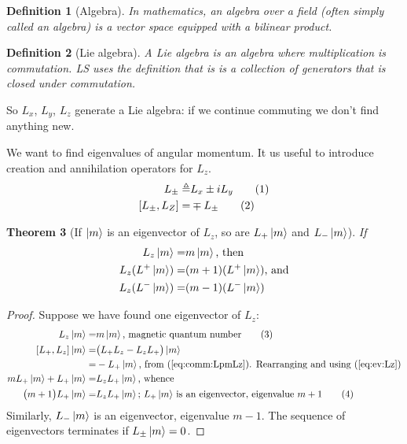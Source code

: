 \documentclass[]{article}
\newcommand\numberthis{\addtocounter{equation}{1}\tag{\theequation}}
\newtheorem{thm}{Theorem}
\newtheorem{defn}[thm]{Definition}
\begin{document}
\begin{defn}[Algebra]
	In mathematics, an \emph{algebra over a field } (often simply called an algebra) is a vector space equipped with a bilinear product. 
\end{defn}

\begin{defn}[Lie algebra]
	A Lie algebra is an algebra where multiplication is commutation. LS uses the definition that is is a collection of generators that is closed under commutation.
\end{defn}

So $L_x$, $L_y$, $L_z$ generate a Lie algebra: if we continue commuting we don't find anything new.

We want to find eigenvalues of angular momentum. It us useful to introduce creation and annihilation operators for $L_z$.
\begin{align*}
	L_{\pm} \triangleq& L_x \pm i L_y \numberthis \label{eq:comm:Lpm}\\
	[L_{\pm},L_Z] =& \mp L_{\pm} \numberthis \label{eq:comm:LpmLz}
\end{align*}

\begin{thm}[If $\ket{m}$ is an eigenvector of $L_z$, so are $L_+ \ket{m}$ and $L_- \ket{m}$]
	If 
	\begin{align*}
		L_z \ket{m} =& m \ket{m} \text{, then }\\
		L_z (L^+ \ket{m}) =& (m+1) (L^+\ket{m}) \text{, and}\\
		L_z (L^- \ket{m}) =& (m-1) (L^-\ket{m})
	\end{align*}
\end{thm}
\begin{proof}
	Suppose we have found one eigenvector of $L_z$:
	\begin{align*}
		L_z \ket{m} =& m \ket{m} \text{, magnetic quantum number}\numberthis \label{eq:ev:Lz}\\
		[L_+,L_z] \ket{m} =& \big(L_+L_z - L_zL_+\big) \ket{m}\\
		=&- L_+ \ket{m} \text{, from (\ref{eq:comm:LpmLz}). Rearranging  and using (\ref{eq:ev:Lz})}\\
		m L_+\ket{m} + L_+\ket{m} =& L_z L_+ \ket{m} \text{, whence}\\
		\big(m + 1 \big)L_+\ket{m}  =& L_z L_+ \ket{m} \text{; $L_+ \ket{m}$ is an eigenvector, eigenvalue $m+1$}\numberthis \label{eq:create_m}
	\end{align*}
	Similarly, $L_- \ket{m}$ is an eigenvector, eigenvalue $m-1$. The sequence of eigenvectors terminates if  $L_{\pm} \ket{m}=0$.
\end{proof}
\end{document}

